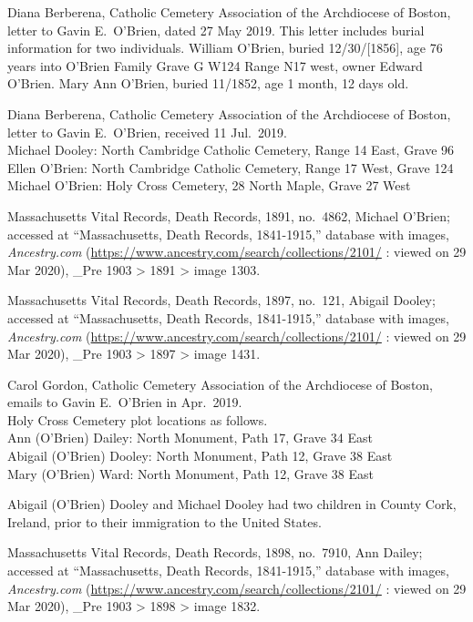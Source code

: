 \begin{thebibliography}{999}
	Diana Berberena, Catholic Cemetery Association of the Archdiocese of Boston, letter to Gavin E.\ O'Brien, dated 27 May 2019. This letter includes burial information for two individuals. William O'Brien, buried 12/30/[1856], age 76 years into O'Brien Family Grave G W124 Range N17 west, owner Edward O'Brien. Mary Ann O'Brien, buried 11/1852, age 1 month, 12 days old.
	
	Diana Berberena, Catholic Cemetery Association of the Archdiocese of Boston, letter to Gavin E.\ O'Brien, received 11 Jul.\ 2019.\\
	Michael Dooley: North Cambridge Catholic Cemetery, Range 14 East, Grave 96\\
	Ellen O’Brien: North Cambridge Catholic Cemetery, Range 17 West, Grave 124\\
	Michael O’Brien: Holy Cross Cemetery, 28 North Maple, Grave 27 West
	
	Massachusetts Vital Records, Death Records, 1891, no.\ 4862, Michael O'Brien; accessed at ``Massachusetts, Death Records, 1841-1915,'' database with images, \textit{Ancestry.com} (\url{https://www.ancestry.com/search/collections/2101/} : viewed on 29 Mar 2020), \_Pre 1903 > 1891 > image 1303.
	
	Massachusetts Vital Records, Death Records, 1897, no.\ 121, Abigail Dooley; accessed at ``Massachusetts, Death Records, 1841-1915,'' database with images, \textit{Ancestry.com} (\url{https://www.ancestry.com/search/collections/2101/} : viewed on 29 Mar 2020), \_Pre 1903 > 1897 > image 1431.
	
	Carol Gordon, Catholic Cemetery Association of the Archdiocese of Boston, emails to Gavin E.\ O'Brien in Apr.\ 2019.\\
	Holy Cross Cemetery plot locations as follows.\\
	Ann (O’Brien) Dailey: North Monument, Path 17, Grave 34 East\\
	Abigail (O’Brien) Dooley: North Monument, Path 12, Grave 38 East\\
	Mary (O’Brien) Ward: North Monument, Path 12, Grave 38 East
	
	Abigail (O'Brien) Dooley and Michael Dooley had two children in County Cork, Ireland, prior to their immigration to the United States. 
	
	Massachusetts Vital Records, Death Records, 1898, no.\ 7910, Ann Dailey; accessed at ``Massachusetts, Death Records, 1841-1915,'' database with images, \textit{Ancestry.com} (\url{https://www.ancestry.com/search/collections/2101/} : viewed on 29 Mar 2020), \_Pre 1903 > 1898 > image 1832.
	

\end{thebibliography}
